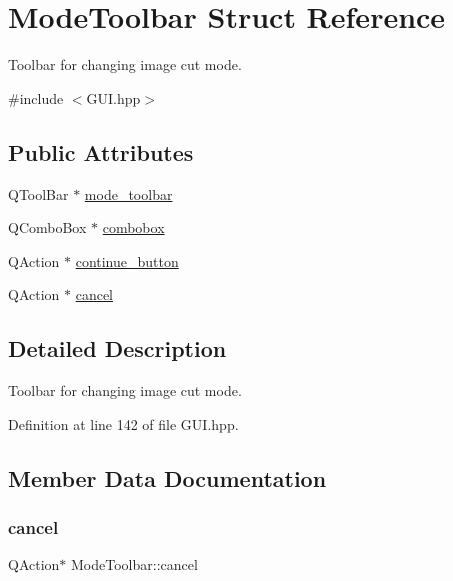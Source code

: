 \hypertarget{structModeToolbar}{}\section{Mode\+Toolbar Struct Reference}
\label{structModeToolbar}


Toolbar for changing image cut mode.  




{\ttfamily \#include $<$G\+U\+I.\+hpp$>$}

\subsection*{Public Attributes}
\begin{DoxyCompactItemize}
\item 
Q\+Tool\+Bar $\ast$ \mbox{\hyperlink{structModeToolbar_acc6bcdd91825343f34ec38d312418234}{mode\+\_\+toolbar}}
\item 
Q\+Combo\+Box $\ast$ \mbox{\hyperlink{structModeToolbar_ad0ba4f03ef2a44e2543add404a50b4f1}{combobox}}
\item 
Q\+Action $\ast$ \mbox{\hyperlink{structModeToolbar_af7d7766f5b1710abb382c42689e963ca}{continue\+\_\+button}}
\item 
Q\+Action $\ast$ \mbox{\hyperlink{structModeToolbar_a814fa4aec4ff40543904dfc4aa4c8e89}{cancel}}
\end{DoxyCompactItemize}


\subsection{Detailed Description}
Toolbar for changing image cut mode. 

Definition at line 142 of file G\+U\+I.\+hpp.



\subsection{Member Data Documentation}
\mbox{\label{structModeToolbar_a814fa4aec4ff40543904dfc4aa4c8e89}} 
\subsubsection{\texorpdfstring{cancel}{cancel}}
{\footnotesize\ttfamily Q\+Action$\ast$ Mode\+Toolbar\+::cancel}

